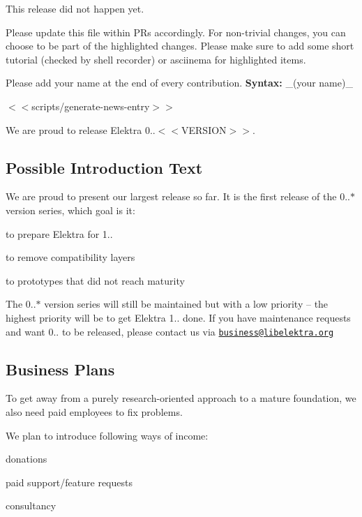 This release did not happen yet.

Please update this file within P\+Rs accordingly. For non-\/trivial changes, you can choose to be part of the highlighted changes. Please make sure to add some short tutorial (checked by shell recorder) or asciinema for highlighted items.

Please add your name at the end of every contribution. {\bfseries Syntax\+:} \+\_\+(your name)\+\_\+

$<$$<${\ttfamily scripts/generate-\/news-\/entry}$>$$>$

We are proud to release Elektra 0..$<$$<$\+V\+E\+R\+S\+I\+O\+N$>$$>$.

\subsection*{Possible Introduction Text}

We are proud to present our largest release so far. It is the first release of the 0..$\ast$ version series, which goal is it\+:


\begin{DoxyItemize}
\item to prepare Elektra for 1..
\item to remove compatibility layers
\item to prototypes that did not reach maturity
\end{DoxyItemize}

The 0..$\ast$ version series will still be maintained but with a low priority -- the highest priority will be to get Elektra 1.. done. If you have maintenance requests and want 0.. to be released, please contact us via \href{mailto:business@libelektra.org}{\tt business@libelektra.\+org}

\subsection*{Business Plans}

To get away from a purely research-\/oriented approach to a mature foundation, we also need paid employees to fix problems.

We plan to introduce following ways of income\+:


\begin{DoxyEnumerate}
\item donations
\item paid support/feature requests
\item consultancy
\end{DoxyEnumerate}

